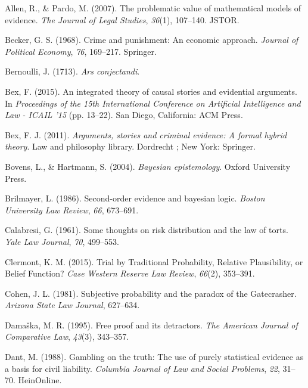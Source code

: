 \documentclass[11pt,dvipsnames,enabledeprecatedfontcommands]{scrartcl}
\begin{document}
\leavevmode\hypertarget{ref-allen2007problematic}{}%
Allen, R., \& Pardo, M. (2007). The problematic value of mathematical
models of evidence. \emph{The Journal of Legal Studies}, \emph{36}(1),
107--140. JSTOR.

\leavevmode\hypertarget{ref-becker1968crime}{}%
Becker, G. S. (1968). Crime and punishment: An economic approach.
\emph{Journal of Political Economy}, \emph{76}, 169--217. Springer.

\leavevmode\hypertarget{ref-Bernoulli1713Ars-conjectandi}{}%
Bernoulli, J. (1713). \emph{Ars conjectandi}.

\leavevmode\hypertarget{ref-bex2015IntegratedTheoryCausal}{}%
Bex, F. (2015). An integrated theory of causal stories and evidential
arguments. In \emph{Proceedings of the 15th International Conference on
Artificial Intelligence and Law - ICAIL '15} (pp. 13--22). San Diego,
California: ACM Press.

\leavevmode\hypertarget{ref-bex2011ArgumentsStoriesCriminal}{}%
Bex, F. J. (2011). \emph{Arguments, stories and criminal evidence: A
formal hybrid theory}. Law and philosophy library. Dordrecht ; New York:
Springer.

\leavevmode\hypertarget{ref-bovens2004bayesian}{}%
Bovens, L., \& Hartmann, S. (2004). \emph{Bayesian epistemology}. Oxford
University Press.

\leavevmode\hypertarget{ref-brilmayer1986}{}%
Brilmayer, L. (1986). Second-order evidence and bayesian logic.
\emph{Boston University Law Review}, \emph{66}, 673--691.

\leavevmode\hypertarget{ref-Calabresi1961}{}%
Calabresi, G. (1961). Some thoughts on risk distribution and the law of
torts. \emph{Yale Law Journal}, \emph{70}, 499--553.

\leavevmode\hypertarget{ref-clermont2015TrialTraditionalProbability}{}%
Clermont, K. M. (2015). Trial by Traditional Probability, Relative
Plausibility, or Belief Function? \emph{Case Western Reserve Law
Review}, \emph{66}(2), 353--391.

\leavevmode\hypertarget{ref-Cohen81}{}%
Cohen, J. L. (1981). Subjective probability and the paradox of the
Gatecrasher. \emph{Arizona State Law Journal}, 627--634.

\leavevmode\hypertarget{ref-damaska1996free}{}%
Damaška, M. R. (1995). Free proof and its detractors. \emph{The American
Journal of Comparative Law}, \emph{43}(3), 343--357.

\leavevmode\hypertarget{ref-dant1988gambling}{}%
Dant, M. (1988). Gambling on the truth: The use of purely statistical
evidence as a basis for civil liability. \emph{Columbia Journal of Law
and Social Problems}, \emph{22}, 31--70. HeinOnline.
\end{document}
